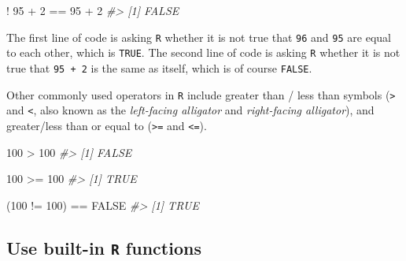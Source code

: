 \documentclass[
]{book}
\newenvironment{Shaded}{\begin{snugshade}}{\end{snugshade}}
\newcommand{\CommentTok}[1]{\textcolor[rgb]{0.56,0.35,0.01}{\textit{#1}}}
\newcommand{\ConstantTok}[1]{\textcolor[rgb]{0.00,0.00,0.00}{#1}}
\newcommand{\DecValTok}[1]{\textcolor[rgb]{0.00,0.00,0.81}{#1}}
\newcommand{\NormalTok}[1]{#1}
\newcommand{\SpecialCharTok}[1]{\textcolor[rgb]{0.00,0.00,0.00}{#1}}
\begin{document}
\begin{Shaded}
\begin{Highlighting}[]
\SpecialCharTok{!} \DecValTok{95} \SpecialCharTok{+} \DecValTok{2} \SpecialCharTok{==} \DecValTok{95} \SpecialCharTok{+} \DecValTok{2}
\CommentTok{\#\textgreater{} [1] FALSE}
\end{Highlighting}
\end{Shaded}

The first line of code is asking \texttt{R} whether it is not true that \texttt{96} and \texttt{95} are equal to each other, which is \texttt{TRUE}. The second line of code is asking \texttt{R} whether it is not true that \texttt{95\ +\ 2} is the same as itself, which is of course \texttt{FALSE}.

Other commonly used operators in \texttt{R} include greater than / less than symbols (\texttt{\textgreater{}} and \texttt{\textless{}}, also known as the \emph{left-facing alligator} and \emph{right-facing alligator}), and greater/less than or equal to (\texttt{\textgreater{}=} and \texttt{\textless{}=}).

\begin{Shaded}
\begin{Highlighting}[]
\DecValTok{100} \SpecialCharTok{\textgreater{}} \DecValTok{100}
\CommentTok{\#\textgreater{} [1] FALSE}
\end{Highlighting}
\end{Shaded}

\begin{Shaded}
\begin{Highlighting}[]
\DecValTok{100} \SpecialCharTok{\textgreater{}=} \DecValTok{100}
\CommentTok{\#\textgreater{} [1] TRUE}
\end{Highlighting}
\end{Shaded}

\begin{Shaded}
\begin{Highlighting}[]
\NormalTok{(}\DecValTok{100} \SpecialCharTok{!=} \DecValTok{100}\NormalTok{) }\SpecialCharTok{==} \ConstantTok{FALSE}
\CommentTok{\#\textgreater{} [1] TRUE}
\end{Highlighting}
\end{Shaded}

\hypertarget{use-built-in-r-functions}{%
\subsection*{\texorpdfstring{Use built-in \texttt{R} functions}{Use built-in R functions}}\label{use-built-in-r-functions}}
\end{document}
